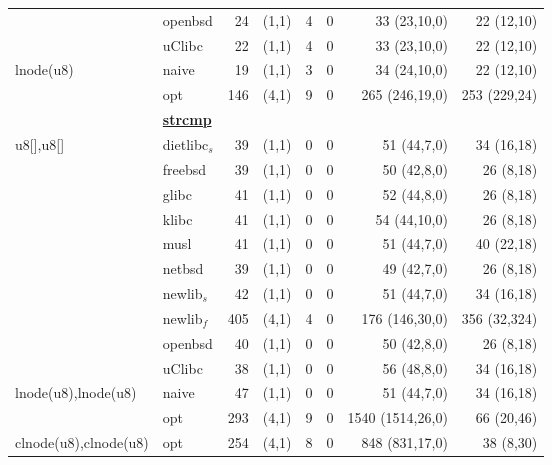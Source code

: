 \begin{table}
\begin{center}
\begin{scriptsize}
\begin{tabular}{@{\hspace{2mm}}l@{\hspace{2mm}}l@{\hspace{2mm}}r@{\hspace{2mm}}c@{\hspace{2mm}}r@{\hspace{2mm}}r@{\hspace{2mm}}r@{\hspace{2mm}}r@{\hspace{2mm}}}
                      & openbsd      & 24   & (1,1) & 4  & 0           & 33 (23,10,0)     & 22 (12,10)    \\
                      & uClibc       & 22   & (1,1) & 4  & 0           & 33 (23,10,0)     & 22 (12,10)    \\
lnode(u8)             & naive        & 19   & (1,1) & 3  & 0           & 34 (24,10,0)     & 22 (12,10)    \\
                      & opt          & 146  & (4,1) & 9  & 0           & 265 (246,19,0)     & 253 (229,24)  \\
& {\bf \underline{strcmp}} \\
u8[],u8[]             & dietlibc$_s$ & 39   & (1,1) & 0  & 0           & 51 (44,7,0)      & 34 (16,18)    \\
                      & freebsd      & 39   & (1,1) & 0  & 0           & 50 (42,8,0)      & 26 (8,18)     \\
                      & glibc        & 41   & (1,1) & 0  & 0           & 52 (44,8,0)      & 26 (8,18)     \\
                      & klibc        & 41   & (1,1) & 0  & 0           & 54 (44,10,0)     & 26 (8,18)     \\
                      & musl         & 41   & (1,1) & 0  & 0           & 51 (44,7,0)      & 40 (22,18)    \\
                      & netbsd       & 39   & (1,1) & 0  & 0           & 49 (42,7,0)      & 26 (8,18)     \\
                      & newlib$_s$   & 42   & (1,1) & 0  & 0           & 51 (44,7,0)      & 34 (16,18)    \\
                      & newlib$_f$   & 405  & (4,1) & 4  & 0           & 176 (146,30,0)   & 356 (32,324)  \\
                      & openbsd      & 40   & (1,1) & 0  & 0           & 50 (42,8,0)      & 26 (8,18)     \\
                      & uClibc       & 38   & (1,1) & 0  & 0           & 56 (48,8,0)      & 34 (16,18)    \\
lnode(u8),lnode(u8)   & naive        & 47   & (1,1) & 0  & 0           & 51 (44,7,0)      & 34 (16,18)    \\
                      & opt          & 293  & (4,1) & 9  & 0           & 1540 (1514,26,0) & 66 (20,46)    \\
clnode(u8),clnode(u8) & opt          & 254  & (4,1) & 8  & 0           & 848 (831,17,0)   & 38 (8,30)     \\

\end{tabular}
\end{scriptsize}
\end{center}
\end{table}
